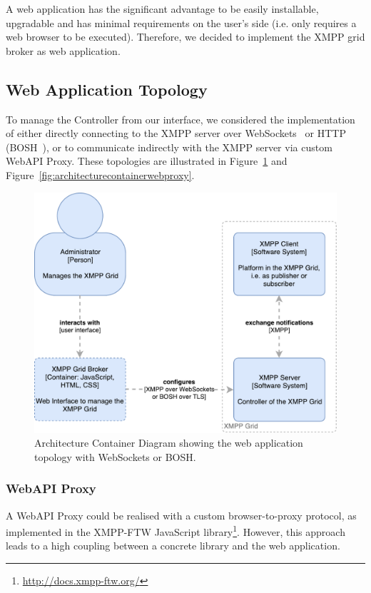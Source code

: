 A web application has the significant advantage to be easily installable, upgradable and has minimal requirements on the user's side (i.e. only requires a web browser to be executed).
Therefore, we decided to implement the XMPP grid broker as web application.

\subsection{Web Application Topology}

To manage the Controller from our interface, we considered the implementation of either directly connecting to the XMPP server over WebSockets~\cite{rfc7395} or HTTP (BOSH~\cite{xep-0124}), or to communicate indirectly with the XMPP server via custom WebAPI Proxy.
These topologies are illustrated in Figure~\ref{fig:architecturecontainerwebapplication} and Figure~\ref{fig:architecturecontainerwebproxy}.

\begin{figure}[h]
\centering
\includegraphics[width=0.7\linewidth]{resources/architecture_container_webapplication}
\caption[Architecture Container Diagram: Web Application]{Architecture Container Diagram showing the web application topology with WebSockets or BOSH.}
\label{fig:architecturecontainerwebapplication}
\end{figure}

\subsubsection{WebAPI Proxy}

A WebAPI Proxy could be realised with a custom browser-to-proxy protocol, as implemented in the XMPP-FTW JavaScript library\footnote{\url{http://docs.xmpp-ftw.org/}}.
However, this approach leads to a high coupling between a concrete library and the web application.

